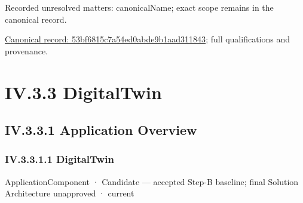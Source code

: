 {\small Recorded unresolved matters: canonicalName; exact scope remains in the canonical record.}\par
{\footnotesize \href{../../../../continuum/application/application-component/53bf6815c7a54ed0abde9b1aad311843.md}{Canonical record: 53bf6815c7a54ed0abde9b1aad311843}; full qualifications and provenance.}\par
\section*{IV.3.3 DigitalTwin}
\label{navigation:IV.3.3}

\subsection*{IV.3.3.1 Application Overview}
\label{navigation:IV.3.3.1}

\subsubsection*{IV.3.3.1.1 DigitalTwin}
\label{navigation:IV.3.3.1.1}

\label{element:3f64d339648246e99e8866c8089f8960}
{\small ApplicationComponent · Candidate — accepted Step-B baseline; final Solution Architecture unapproved · current}\par

